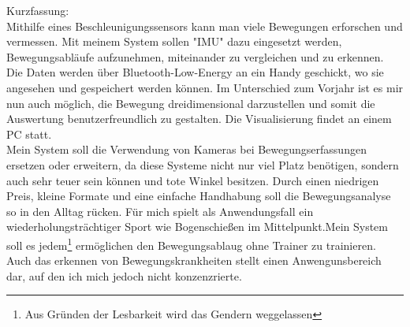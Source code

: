 Kurzfassung:\\
\small
Mithilfe eines Beschleunigungssensors kann man viele Bewegungen erforschen und vermessen. 
Mit meinem System sollen "IMU" dazu eingesetzt werden, Bewegungsabläufe aufzunehmen, miteinander zu vergleichen 
und zu erkennen. \\
Die Daten werden über Bluetooth-Low-Energy an ein Handy geschickt, wo sie angesehen und gespeichert 
werden können. Im Unterschied zum Vorjahr ist es mir nun auch möglich, die Bewegung dreidimensional 
darzustellen und somit die Auswertung benutzerfreundlich zu gestalten. Die Visualisierung findet an 
einem PC statt.\\
Mein System soll die Verwendung von Kameras bei Bewegungserfassungen ersetzen oder erweitern, da diese Systeme 
nicht nur viel Platz benötigen, sondern auch sehr teuer sein können und tote Winkel besitzen. 
Durch einen niedrigen Preis, kleine Formate und eine einfache Handhabung soll die Bewegungsanalyse 
so in den Alltag rücken. Für mich spielt als Anwendungsfall ein wiederholungsträchtiger Sport wie 
Bogenschießen im Mittelpunkt.Mein System soll es jedem\footnote{Aus Gründen der Lesbarkeit wird das Gendern weggelassen} 
ermöglichen den Bewegungsablaug ohne Trainer zu trainieren.\\
Auch das erkennen von Bewegungskrankheiten stellt einen Anwengunsbereich dar, auf den ich mich jedoch nicht konzenzrierte.